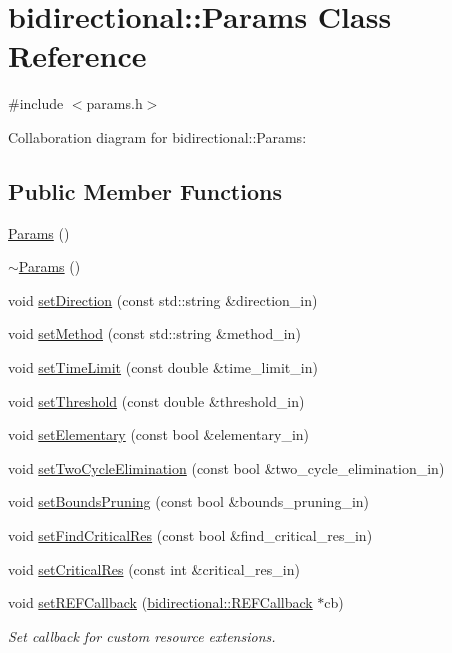 \hypertarget{classbidirectional_1_1Params}{}\section{bidirectional\+:\+:Params Class Reference}
\label{classbidirectional_1_1Params}


{\ttfamily \#include $<$params.\+h$>$}



Collaboration diagram for bidirectional\+:\+:Params\+:
\subsection*{Public Member Functions}
\begin{DoxyCompactItemize}
\item 
\hyperlink{classbidirectional_1_1Params_a4873db87f0c812884543365b3a075de2}{Params} ()
\item 
\hyperlink{classbidirectional_1_1Params_a2f4b540e09b10800d412da8af5ddfb2a}{$\sim$\+Params} ()
\item 
void \hyperlink{classbidirectional_1_1Params_a8cd76d63403256defcfff896d33a4fc6}{set\+Direction} (const std\+::string \&direction\+\_\+in)
\item 
void \hyperlink{classbidirectional_1_1Params_ac469873b9d5dbc166ee387b9ddc968f5}{set\+Method} (const std\+::string \&method\+\_\+in)
\item 
void \hyperlink{classbidirectional_1_1Params_a6d2cd9d82200130aa3bca9f207e85422}{set\+Time\+Limit} (const double \&time\+\_\+limit\+\_\+in)
\item 
void \hyperlink{classbidirectional_1_1Params_a6c8b580515f2730f7b8362c8c86efc4d}{set\+Threshold} (const double \&threshold\+\_\+in)
\item 
void \hyperlink{classbidirectional_1_1Params_aeb8196a318f012a4fb1756c4f267f030}{set\+Elementary} (const bool \&elementary\+\_\+in)
\item 
void \hyperlink{classbidirectional_1_1Params_acc5edce835f155bb15c3edcb991d1fb0}{set\+Two\+Cycle\+Elimination} (const bool \&two\+\_\+cycle\+\_\+elimination\+\_\+in)
\item 
void \hyperlink{classbidirectional_1_1Params_adc2cc88c79856b8f6aed271b99c60bd2}{set\+Bounds\+Pruning} (const bool \&bounds\+\_\+pruning\+\_\+in)
\item 
void \hyperlink{classbidirectional_1_1Params_a3c344fd31c2bd86c4308e65169546a1b}{set\+Find\+Critical\+Res} (const bool \&find\+\_\+critical\+\_\+res\+\_\+in)
\item 
void \hyperlink{classbidirectional_1_1Params_a4cb80c6a553af542ee696b63f031d547}{set\+Critical\+Res} (const int \&critical\+\_\+res\+\_\+in)
\item 
void \hyperlink{classbidirectional_1_1Params_a1f73fd12554f071113a5487a78e53d49}{set\+R\+E\+F\+Callback} (\hyperlink{classbidirectional_1_1REFCallback}{bidirectional\+::\+R\+E\+F\+Callback} $\ast$cb)
\begin{DoxyCompactList}\small\item\em Set callback for custom resource extensions. \end{DoxyCompactList}\end{DoxyCompactItemize}
